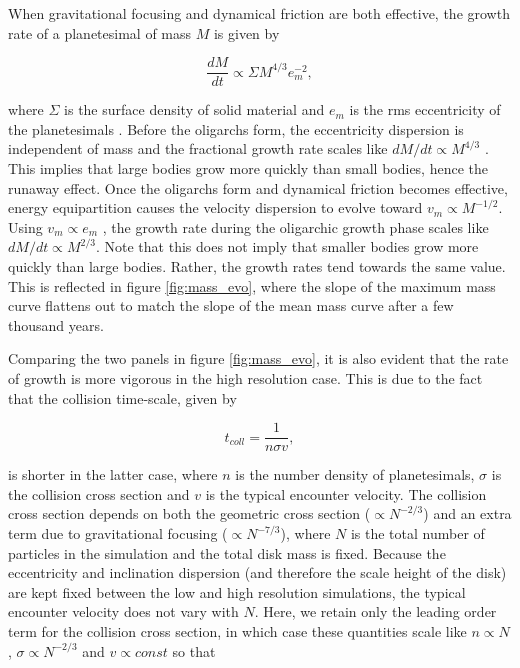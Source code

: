 When gravitational focusing and dynamical friction are both effective, the growth rate of a planetesimal of mass $M$ is given by

\begin{equation}\label{eq:growth_rate}
\frac{dM}{dt} \propto \Sigma M^{4/3} e_{m}^{-2},
\end{equation}

\noindent where $\Sigma$ is the surface density of solid material and $e_m$ is the rms eccentricity of the planetesimals 
\cite{kokubo95}. Before the oligarchs form, the eccentricity dispersion is independent of mass and the fractional growth rate 
scales like $dM/dt \propto M^{4/3}$ \cite{wetherill93}. This implies that large bodies grow more quickly than small bodies, hence 
the runaway effect. Once the oligarchs form and dynamical friction becomes effective, energy equipartition causes the velocity 
dispersion to evolve toward $v_m \propto M^{-1/2}$\cite{ida93a}. Using $v_m \propto e_m$ \cite{lissauer93}, the growth rate 
during the oligarchic growth phase scales like  $dM/dt \propto M^{2/3}$. Note that this does not imply that smaller bodies grow 
more quickly than large bodies. Rather, the growth rates tend towards the same value. This is reflected in figure 
\ref{fig:mass_evo}, where the slope of the maximum mass curve flattens out to match the slope of the mean mass curve after a 
few thousand years.

Comparing the two panels in figure \ref{fig:mass_evo}, it is also evident that the rate of growth is more vigorous in the high 
resolution case. This is due to the fact that the collision time-scale, given by 

\begin{equation}\label{eq:coll_timescale}
t_{coll} = \frac{1}{n \sigma v},
\end{equation}

\noindent is shorter in the latter case, where $n$ is the number density of planetesimals, $\sigma$ is the collision cross section 
and $v$ is the typical encounter velocity. The collision cross section depends on both the geometric cross section ($\propto 
N^{-2/3}$) and an extra term due to gravitational focusing ($\propto N^{-7/3}$), where $N$ is the total number of particles in the 
simulation and the total disk mass is fixed. Because the eccentricity and inclination dispersion (and therefore the scale height of 
the disk) are kept fixed between the low and high resolution simulations, the typical encounter velocity does not vary with $N$. 
Here, we retain only the leading order term for the collision cross section, in which case these quantities scale like $n \propto N$, 
$\sigma \propto N^{-2/3}$ and $v \propto const$ so that

